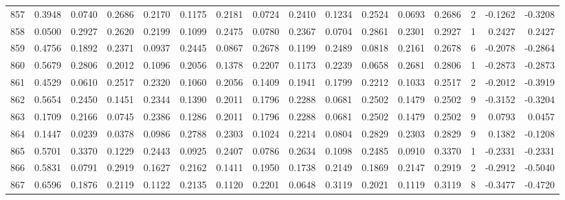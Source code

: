 \begin{tabular}{lrrrrrrrrrrrrrrr}
857 &      0.3948 &  0.0740 &  0.2686 &  0.2170 &  0.1175 &  0.2181 &  0.0724 &  0.2410 &  0.1234 &  0.2524 &   0.0693 &     0.2686 &      2 &                   -0.1262 &                    -0.3208 \\
858 &      0.0500 &  0.2927 &  0.2620 &  0.2199 &  0.1099 &  0.2475 &  0.0780 &  0.2367 &  0.0704 &  0.2861 &   0.2301 &     0.2927 &      1 &                    0.2427 &                     0.2427 \\
859 &      0.4756 &  0.1892 &  0.2371 &  0.0937 &  0.2445 &  0.0867 &  0.2678 &  0.1199 &  0.2489 &  0.0818 &   0.2161 &     0.2678 &      6 &                   -0.2078 &                    -0.2864 \\
860 &      0.5679 &  0.2806 &  0.2012 &  0.1096 &  0.2056 &  0.1378 &  0.2207 &  0.1173 &  0.2239 &  0.0658 &   0.2681 &     0.2806 &      1 &                   -0.2873 &                    -0.2873 \\
861 &      0.4529 &  0.0610 &  0.2517 &  0.2320 &  0.1060 &  0.2056 &  0.1409 &  0.1941 &  0.1799 &  0.2212 &   0.1033 &     0.2517 &      2 &                   -0.2012 &                    -0.3919 \\
862 &      0.5654 &  0.2450 &  0.1451 &  0.2344 &  0.1390 &  0.2011 &  0.1796 &  0.2288 &  0.0681 &  0.2502 &   0.1479 &     0.2502 &      9 &                   -0.3152 &                    -0.3204 \\
863 &      0.1709 &  0.2166 &  0.0745 &  0.2386 &  0.1286 &  0.2011 &  0.1796 &  0.2288 &  0.0681 &  0.2502 &   0.1479 &     0.2502 &      9 &                    0.0793 &                     0.0457 \\
864 &      0.1447 &  0.0239 &  0.0378 &  0.0986 &  0.2788 &  0.2303 &  0.1024 &  0.2214 &  0.0804 &  0.2829 &   0.2303 &     0.2829 &      9 &                    0.1382 &                    -0.1208 \\
865 &      0.5701 &  0.3370 &  0.1229 &  0.2443 &  0.0925 &  0.2407 &  0.0786 &  0.2634 &  0.1098 &  0.2485 &   0.0910 &     0.3370 &      1 &                   -0.2331 &                    -0.2331 \\
866 &      0.5831 &  0.0791 &  0.2919 &  0.1627 &  0.2162 &  0.1411 &  0.1950 &  0.1738 &  0.2149 &  0.1869 &   0.2147 &     0.2919 &      2 &                   -0.2912 &                    -0.5040 \\
867 &      0.6596 &  0.1876 &  0.2119 &  0.1122 &  0.2135 &  0.1120 &  0.2201 &  0.0648 &  0.3119 &  0.2021 &   0.1119 &     0.3119 &      8 &                   -0.3477 &                    -0.4720 \\

\end{tabular}
